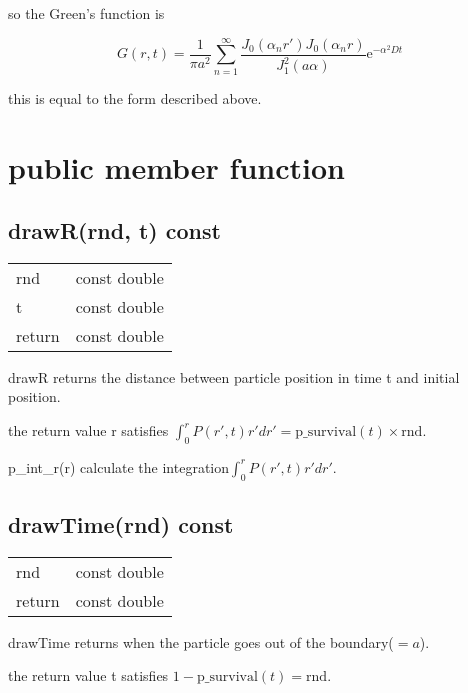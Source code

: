 \documentclass{article}
\begin{document}
so the Green's function is

\begin{equation}
    G(r, t) = \frac{1}{\pi a^2} \sum^\infty_{n=1}
              \frac{J_0(\alpha_n r')J_0(\alpha_n r)}{J^2_1(a\alpha)}
              \mathrm{e}^{-\alpha^2 Dt} \nonumber
\end{equation}

this is equal to the form described above.

\section{public member function}

\subsection{drawR(rnd, t) const}

\begin{table}[htb]
    \begin{tabular}{ll}
        rnd    & const double \\
        t      & const double \\
        return & const double
    \end{tabular}
\end{table}

drawR returns the distance between particle position in time t and initial position.

the return value r satisfies
$\int^r_0 P(r', t) r'dr' = \mathrm{p\_survival}(t) \times \mathrm{rnd}$.

p\_int\_r(r) calculate the integration$\int^r_0 P(r',t) r'dr'$.

\subsection{drawTime(rnd) const}

\begin{table}[htb]
    \begin{tabular}{ll}
        rnd     & const double \\
        return  & const double
    \end{tabular}
\end{table}

drawTime returns when the particle goes out of the boundary($ = a$).

the return value t satisfies $ 1 - \mathrm{p\_survival}(t) = \mathrm{rnd}$.
\end{document}

